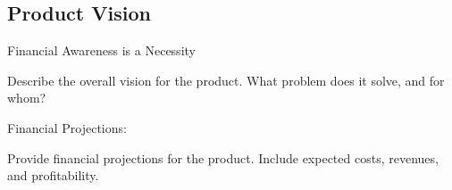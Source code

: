 
\subsection{Product Vision}

Financial Awareness is a Necessity 

Describe the overall vision for the product.
What problem does it solve, and for whom?

Financial Projections:

    Provide financial projections for the product.
    Include expected costs, revenues, and profitability.
